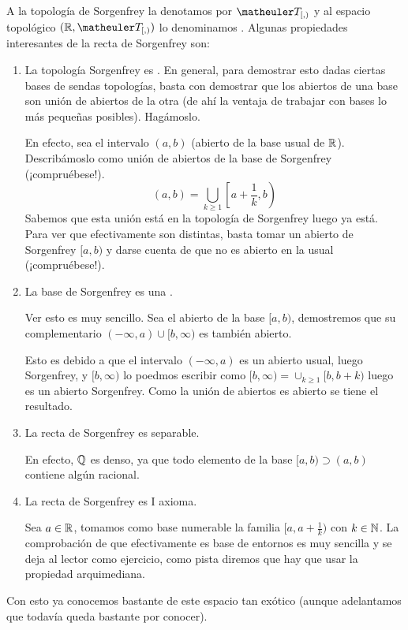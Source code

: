 	\begin{exa}
		\label{etop_sorgenfrey}
		A la topología de Sorgenfrey la denotamos por $\T_{[,)}$ y al espacio topológico $(\R,\T_{[,)})$ lo denominamos . Algunas propiedades interesantes de la recta de Sorgenfrey son:
	\begin{enumerate}
		\item La topología Sorgenfrey es . En general, para demostrar esto dadas ciertas bases de sendas topologías, basta con demostrar que los abiertos de una base son unión de abiertos de la otra (de ahí la ventaja de trabajar con bases lo más pequeñas posibles). Hagámoslo.
		
		En efecto, sea el intervalo $(a,b)$ (abierto de la base usual de $\mathbb{R}$). Describámoslo como unión de abiertos de la base de Sorgenfrey (¡compruébese!).
		\begin{equation}
			(a,b) = \bigcup_{k\geq 1} \left[a+\frac{1}{k},b\right)
		\end{equation}
		Sabemos que esta unión está en la topología de Sorgenfrey luego ya está.
	Para ver que efectivamente son distintas, basta tomar un abierto de Sorgenfrey $[a,b)$ y darse cuenta de que no es abierto en la usual (¡compruébese!).
	
	\item La base de Sorgenfrey es una .
	
	Ver esto es muy sencillo. Sea el abierto de la base $[a,b)$, demostremos que su complementario $(-\infty, a) \cup [b,\infty)$ es también abierto.
	
	Esto es debido a  que el intervalo $(-\infty, a)$ es un abierto usual, luego Sorgenfrey, y $[b,\infty)$ lo poedmos escribir como $[b,\infty) = \cup_{k\geq1} [b, b+k)$ luego es un abierto Sorgenfrey. Como la unión de abiertos es abierto se tiene el resultado.
	\item La recta de Sorgenfrey es separable.
	
	En efecto, $\mathbb{Q}$ es denso, ya que todo elemento de la base $[a,b)\supset(a,b)$ contiene algún racional.
	\item La recta de Sorgenfrey es I axioma.
	
	Sea $a\in\mathbb{R}$, tomamos como base numerable la familia $[a, a+\frac{1}{k})$ con $k\in\mathbb{N}$. La comprobación de que efectivamente es base de entornos es muy sencilla y se deja al lector como ejercicio, como pista diremos que hay que usar la propiedad arquimediana.
	\end{enumerate}
	Con esto ya conocemos bastante de este espacio tan exótico (aunque adelantamos que todavía queda bastante por conocer).
\end{exa}



